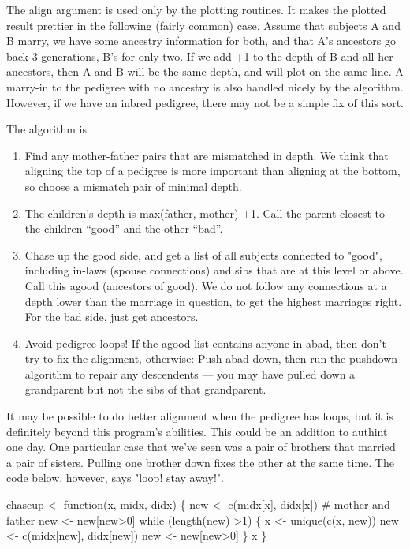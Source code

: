 \documentclass{article}
\begin{document}
The align argument is used only by the plotting routines.  
It makes the plotted result prettier in the following (fairly common)
case. 
Assume that subjects A and B marry, we have some ancestry information for
both, and that A's ancestors go back 3 generations, B's for only two.
If we add +1 to the depth of B and all her ancestors, then A and B
will be the same depth, and will plot on the same line.
A marry-in to the pedigree with no ancestry is also handled nicely
by the algorithm.
However, if we have an inbred pedigree, there may not be a simple fix
of this sort.

The algorithm is
\begin{enumerate}
  \item Find any mother-father pairs that are mismatched in depth.
    We think that aligning the top of a pedigree is more important
    than aligning at the bottom, so choose a mismatch pair of minimal
    depth.
  \item The children's depth is max(father, mother) +1.  Call the
    parent closest to the children ``good'' and the other ``bad''.
  \item  Chase up the good side, and get a list of all subjects connected
    to "good", including in-laws (spouse connections) and sibs that are
    at this level or above.  Call this agood (ancestors of good).
    We do not follow any connections at a depth lower than the 
    marriage in question, to get the highest marriages right.
    For the bad side, just get ancestors.
  \item Avoid pedigree loops!  If the agood list contains anyone in abad,
    then don't try to fix the alignment, otherwise:
    Push abad down, then run the pushdown algorithm to
    repair any descendents --- you may have pulled down a grandparent but
    not the sibs of that grandparent.
\end{enumerate}
    
It may be possible to do better alignment when the pedigree has loops,
but it is definitely beyond this program's abilities.  This could be
an addition to authint one day.
One particular case that we've seen was a pair of brothers that married
a pair of sisters.  Pulling one brother down fixes the other at the
same time.
The code below, however, says "loop! stay away!".
\nwenddocs{}\plusendmoddef

    chaseup <- function(x, midx, didx) \{
        new <- c(midx[x], didx[x])  # mother and father
        new <- new[new>0]
        while (length(new) >1) \{
            x <- unique(c(x, new))
            new <- c(midx[new], didx[new])
            new <- new[new>0]
            \}
        x
        \}
        
\end{document}
